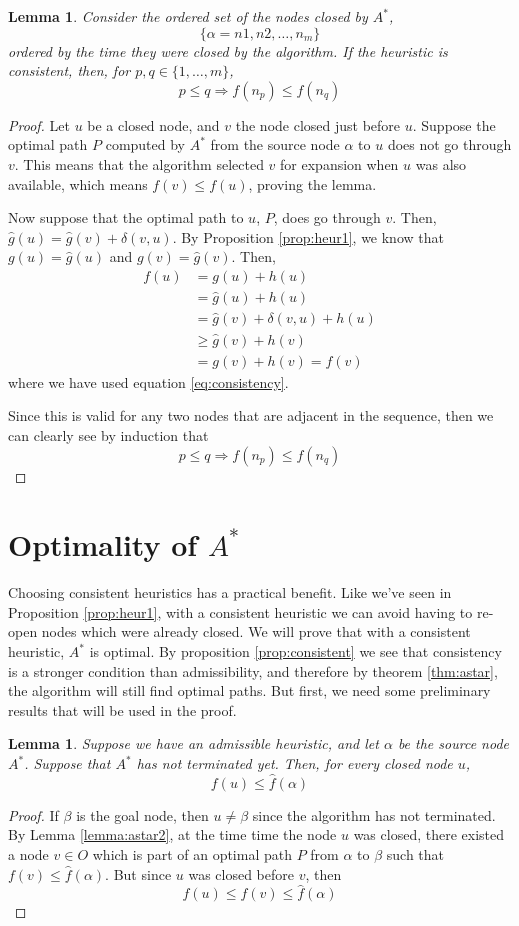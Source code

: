 \documentclass[12pt]{report}
\newtheorem{lemma}[theorem]{Lemma}
\begin{document}
\begin{lemma}
\label{lemma:heur2}
Consider the ordered set of the nodes closed by $A^*$, 
\[ \{ \alpha = n1, n2, \dots, n_m \} \]
ordered by the time they were closed by the algorithm. If the heuristic is consistent, then, for $p, q \in \{ 1, \dots, m \}$,
\[ p \leq q \Rightarrow f(n_p) \leq f(n_q) \]
\end{lemma}
\begin{proof}
Let $u$ be a closed node, and $v$ the node closed just before $u$. Suppose the optimal path $P$ computed by $A^*$ from the source node $\alpha$ to $u$ does not go through $v$. This means that the algorithm selected $v$ for expansion when $u$ was also available, which means $f(v) \leq f(u)$, proving the lemma.

Now suppose that the optimal path to $u$, $P$, does go through $v$. Then, $\hat{g}(u) = \hat{g}(v) + \delta(v, u)$. By Proposition \ref{prop:heur1}, we know that $g(u) = \hat{g}(u)$ and $g(v) = \hat{g}(v)$. Then,
\begin{align*}
f(u) &= g(u) + h(u)\\
&= \hat{g}(u) + h(u)\\
&= \hat{g}(v) + \delta(v, u) + h(u)\\
&\geq \hat{g}(v) + h(v)\\
&= g(v) + h(v) = f(v)
\end{align*}
where we have used equation \ref{eq:consistency}.

Since this is valid for any two nodes that are adjacent in the sequence, then we can clearly see by induction that
\[ p \leq q \Rightarrow f(n_p) \leq f(n_q) \]
\end{proof}

\section{Optimality of $A^*$}
Choosing consistent heuristics has a practical benefit. Like we've seen in Proposition \ref{prop:heur1}, with a consistent heuristic we can avoid having to re-open nodes which were already closed. We will prove that with a consistent heuristic, $A^*$ is optimal. By proposition \ref{prop:consistent} we see that consistency is a stronger condition than admissibility, and therefore by theorem \ref{thm:astar}, the algorithm will still find optimal paths. But first, we need some preliminary results that will be used in the proof.

\begin{lemma}
\label{lemma:astar-opt}
Suppose we have an admissible heuristic, and let $\alpha$ be the source node $A^*$. Suppose that $A^*$ has not terminated yet. Then, for every closed node $u$,
\[ f(u) \leq \hat{f}(\alpha) \]
\end{lemma}
\begin{proof}
If $\beta$ is the goal node, then $u \neq \beta$ since the algorithm has not terminated. By Lemma \ref{lemma:astar2}, at the time time the node $u$ was closed, there existed a node $v \in O$ which is part of an optimal path $P$ from $\alpha$ to $\beta$ such that $f(v) \leq \hat{f}(\alpha)$.
But since $u$ was closed before $v$, then
\[ f(u) \leq f(v) \leq \hat{f}(\alpha) \]
\end{proof}
\end{document}
